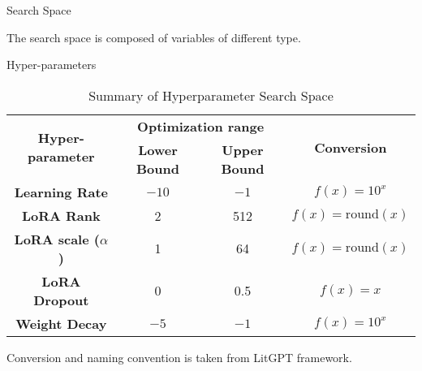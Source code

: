 \begin{frame}{Search Space}

    The search space is composed of variables of different type.

    \begin{block}{Hyper-parameters}
    
        \begin{table}[h!]
            \centering
            \begin{tabular}{|c|c|c|c|}
                \hline
                \multirow{2}{*}{\textbf{Hyper-parameter}} & \multicolumn{2}{|c|}{\textbf{Optimization range}} & \multirow{2}{*}{\textbf{Conversion}} \\
                \cline{2-3}
                 & \textbf{Lower Bound} & \textbf{Upper Bound} &  \\
                \hline
                \textbf{Learning Rate} & $-10$ & $-1$ & $f(x) = 10^{x}$ \\
                \hline
                \textbf{LoRA Rank} & 2 & 512 & $f(x) = \text{round}(x)$ \\
                \hline
                \textbf{LoRA scale ($\alpha$)} & 1 & 64 & $f(x) = \text{round}(x)$ \\
                \hline
                \textbf{LoRA Dropout} & 0 & 0.5 & $f(x) = x$ \\
                \hline
                \textbf{Weight Decay} & $-5$ & $-1$ & $f(x) = 10^{x}$  \\
                \hline
            \end{tabular}
            \caption{Summary of Hyperparameter Search Space}
            \label{tab:hyperparam_table}
        \end{table}
        
    \end{block}
    
    Conversion and naming convention is taken from LitGPT framework.
\end{frame}


